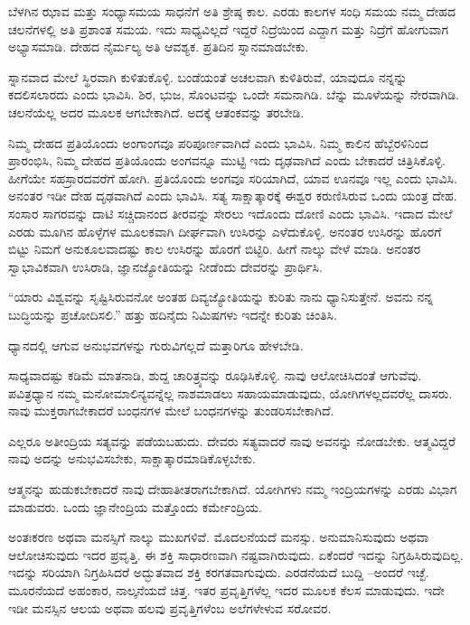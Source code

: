 ಬೆಳಗಿನ ಝಾವ ಮತ್ತು ಸಂಧ್ಯಾಸಮಯ ಸಾಧನೆಗೆ ಅತಿ ಶ್ರೇಷ್ಠ ಕಾಲ. ಎರಡು ಕಾಲಗಳ ಸಂಧಿ ಸಮಯ ನಮ್ಮ ದೇಹದ ಚಲನೆಗಳಲ್ಲಿ ಅತಿ ಪ್ರಶಾಂತ ಸಮಯ. ಇದು ಸಾಧ್ಯವಿಲ್ಲದೆ ಇದ್ದರೆ ನಿದ್ರೆಯಿಂದ ಎದ್ದಾಗ ಮತ್ತು ನಿದ್ರೆಗೆ ಹೋಗುವಾಗ ಅಭ್ಯಾಸಮಾಡಿ. ದೇಹದ ನೈರ್ಮಲ್ಯ ಅತಿ ಆವಶ್ಯಕ. ಪ್ರತಿದಿನ ಸ್ನಾನಮಾಡಬೇಕು.

ಸ್ನಾನವಾದ ಮೇಲೆ ಸ್ಥಿರವಾಗಿ ಕುಳಿತುಕೊಳ್ಳಿ. ಬಂಡೆಯಂತೆ ಅಚಲವಾಗಿ ಕುಳಿತಿರುವೆ, ಯಾವುದೂ ನನ್ನನ್ನು ಕದಲಿಸಲಾರದು ಎಂದು ಭಾವಿಸಿ. ಶಿರ, ಭುಜ, ಸೊಂಟವನ್ನು ಒಂದೇ ಸಮನಾಗಿಡಿ. ಬೆನ್ನು ಮೂಳೆಯನ್ನು ನೇರವಾಗಿಡಿ. ಚಲನೆಯೆಲ್ಲ ಅದರ ಮೂಲಕ ಆಗಬೇಕಾಗಿದೆ. ಅದಕ್ಕೆ ಆತಂಕವನ್ನು ತರಬೇಡಿ.

ನಿಮ್ಮ ದೇಹದ ಪ್ರತಿಯೊಂದು ಅಂಗಾಂಗವೂ ಪರಿಪೂರ್ಣವಾಗಿದೆ ಎಂದು ಭಾವಿಸಿ. ನಿಮ್ಮ ಕಾಲಿನ ಹೆಬ್ಬೆರಳಿನಿಂದ ಪ್ರಾರಂಭಿಸಿ, ನಿಮ್ಮ ದೇಹದ ಪ್ರತಿಯೊಂದು ಅಂಗವನ್ನೂ ಮುಟ್ಟಿ ಇದು ದೃಢವಾಗಿದೆ ಎಂದು ಬೇಕಾದರೆ ಚಿತ್ರಿಸಿಕೊಳ್ಳಿ. ಹೀಗೆಯೇ ಸಹಸ್ರಾರದವರೆಗೆ ಹೋಗಿ. ಪ್ರತಿಯೊಂದು ಅಂಗವೂ ಸರಿಯಾಗಿದೆ, ಯಾವ ಊನವೂ ಇಲ್ಲ ಎಂದು ಭಾವಿಸಿ. ಅನಂತರ ಇಡೀ ದೇಹ ದೃಢವಾಗಿದೆ ಎಂದು ಭಾವಿಸಿ. ಸತ್ಯ ಸಾಕ್ಷಾತ್ಕಾರಕ್ಕೆ ಈಶ್ವರ ಕರುಣಿಸಿರುವ ಒಂದು ಯಂತ್ರ ದೇಹ. ಸಂಸಾರ ಸಾಗರವನ್ನು ದಾಟಿ ಸಚ್ಚಿದಾನಂದ ತೀರವನ್ನು ಸೇರಲು ಇದೊಂದು ದೋಣಿ ಎಂದು ಭಾವಿಸಿ. ಇದಾದ ಮೇಲೆ ಎರಡು ಮೂಗಿನ ಹೊಳ್ಳೆಗಳ ಮೂಲಕವಾಗಿ ದೀರ್ಘವಾಗಿ ಉಸಿರನ್ನು ಎಳೆದುಕೊಳ್ಳಿ. ಅನಂತರ ಉಸಿರನ್ನು ಹೊರಗೆ ಬಿಟ್ಟು ನಿಮಗೆ ಅನುಕೂಲವಾದಷ್ಟು ಕಾಲ ಉಸಿರನ್ನು ಹೊರಗೆ ಬಿಟ್ಟಿರಿ. ಹೀಗೆ ನಾಲ್ಕು ವೇಳೆ ಮಾಡಿ. ಅನಂತರ ಸ್ವಾಭಾವಿಕವಾಗಿ ಉಸಿರಾಡಿ, ಜ್ಞಾನಜ್ಯೋತಿಯನ್ನು ನೀಡೆಂದು ದೇವರನ್ನು ಪ್ರಾರ್ಥಿಸಿ.

“ಯಾರು ವಿಶ್ವವನ್ನು ಸೃಷ್ಟಿಸಿರುವನೋ ಅಂತಹ ದಿವ್ಯಜ್ಯೋತಿಯನ್ನು ಕುರಿತು ನಾನು ಧ್ಯಾನಿಸುತ್ತೇನೆ. ಅವನು ನನ್ನ ಬುದ್ಧಿಯನ್ನು ಪ್ರಚೋದಿಸಲಿ.'' ಹತ್ತು ಹದಿನೈದು ನಿಮಿಷಗಳು ಇದನ್ನೇ ಕುರಿತು ಚಿಂತಿಸಿ.

ಧ್ಯಾನದಲ್ಲಿ ಆಗುವ ಅನುಭವಗಳನ್ನು ಗುರುವಿಗಲ್ಲದೆ ಮತ್ತಾರಿಗೂ ಹೇಳಬೇಡಿ.

ಸಾಧ್ಯವಾದಷ್ಟು ಕಡಿಮೆ ಮಾತನಾಡಿ, ಶುದ್ದ ಚಾರಿತ್ರ್ಯವನ್ನು ರೂಢಿಸಿಕೊಳ್ಳಿ. ನಾವು ಆಲೋಚಿಸಿದಂತೆ ಆಗುವೆವು. ಪವಿತ್ರಧ್ಯಾನ ನಮ್ಮ ಮನೋಮಾಲಿನ್ಯವನ್ನೆಲ್ಲ ನಾಶಮಾಡಲು ಸಹಾಯಮಾಡುವುದು, ಯೋಗಿಗಳಲ್ಲದವರೆಲ್ಲ ದಾಸರು. ನಾವು ಮುಕ್ತರಾಗಬೇಕಾದರೆ ಬಂಧನಗಳ ಮೇಲೆ ಬಂಧನಗಳನ್ನು ತುಂಡರಿಸಬೇಕಾಗಿದೆ.

ಎಲ್ಲರೂ ಅತೀಂದ್ರಿಯ ಸತ್ಯವನ್ನು ಪಡೆಯಬಹುದು. ದೇವರು ಸತ್ಯವಾದರೆ ನಾವು ಅವನನ್ನು ನೋಡಬೇಕು. ಆತ್ಮವಿದ್ದರೆ ನಾವು ಅದನ್ನು ಅನುಭವಿಸಬೇಕು, ಸಾಕ್ಷಾತ್ಕಾರಮಾಡಿಕೊಳ್ಳಬೇಕು.

ಆತ್ಮನನ್ನು ಹುಡುಕಬೇಕಾದರೆ ನಾವು ದೇಹಾತೀತರಾಗಬೇಕಾಗಿದೆ. ಯೋಗಿಗಳು ನಮ್ಮ ಇಂದ್ರಿಯಗಳನ್ನು ಎರಡು ವಿಭಾಗ ಮಾಡುವರು. ಒಂದು ಜ್ಞಾನೇಂದ್ರಿಯ ಮತ್ತೊಂದು ಕರ್ಮೇಂದ್ರಿಯ.

ಅಂತಃಕರಣ ಅಥವಾ ಮನಸ್ಸಿಗೆ ನಾಲ್ಕು ಮುಖಗಳಿವೆ. ಮೊದಲನೆಯದೆ ಮನಸ್ಸು. ಅನುಮಾನಿಸುವುದು ಅಥವಾ ಆಲೋಚಿಸುವುದು ಇದರ ಪ್ರವೃತ್ತಿ. ಈ ಶಕ್ತಿ ಸಾಧಾರಣವಾಗಿ ನಷ್ಟವಾಗಿರುವುದು. ಏಕೆಂದರೆ ಇದನ್ನು ನಿಗ್ರಹಿಸಿರುವುದಿಲ್ಲ. ಇದನ್ನು ಸರಿಯಾಗಿ ನಿಗ್ರಹಿಸಿದರೆ ಅದ್ಭುತವಾದ ಶಕ್ತಿ ಕರಗತವಾಗುವುದು. ಎರಡನೆಯದೆ ಬುದ್ದಿ –ಅಂದರೆ ಇಚ್ಛೆ. ಮೂರನೆಯದೆ ಅಹಂಕಾರ, ನಾಲ್ಕನೆಯದೆ ಚಿತ್ತ. ಇತರ ಪ್ರವೃತ್ತಿಗಳೆಲ್ಲ ಇದರ ಮೂಲಕ ಕೆಲಸ ಮಾಡುವುದು. ಇದೇ ಇಡೀ ಮನಸ್ಸಿನ ಆಲಯ ಅಥವಾ ಹಲವು ಪ್ರವೃತ್ತಿಗಳೆಂಬ ಅಲೆಗಳೇಳುವ ಸರೋವರ.

